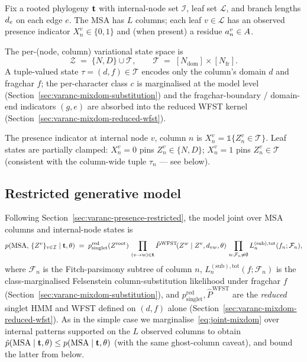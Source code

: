 Fix a rooted phylogeny $\mathbf{t}$ with internal-node set
$\mathcal{I}$, leaf set $\mathcal{L}$, and branch lengths
$d_e$ on each edge $e$. The MSA has $L$ columns; each leaf
$v \in \mathcal{L}$ has an observed presence indicator
$X^v_n \in \{0, 1\}$ and (when present) a residue
$a^v_n \in A$.

The per-(node, column) variational state space is
\begin{equation}
\label{eq:Z-mixdom}
\mathcal{Z} \;=\; \{N, D\} \cup \mathcal{T},
\qquad
\mathcal{T} \;=\; [N_{\text{dom}}] \times [N_{\text{fr}}].
\end{equation}
A tuple-valued state $\tau = (d, f) \in \mathcal{T}$ encodes only the
column's domain $d$ and fragchar $f$; the per-character class $c$ is
marginalised at the model level (Section~\ref{sec:varanc-mixdom-substitution})
and the fragchar-boundary / domain-end indicators $(g, e)$ are
absorbed into the reduced WFST kernel
(Section~\ref{sec:varanc-mixdom-reduced-wfst}).

The presence indicator at internal node $v$, column $n$ is
$X^v_n = \mathbb{1}\{Z^v_n \in \mathcal{T}\}$. Leaf states are
partially clamped: $X^v_n = 0$ pins $Z^v_n \in \{N, D\}$;
$X^v_n = 1$ pins $Z^v_n \in \mathcal{T}$ (consistent with the
column-wide tuple $\tau_n$ — see below).

\subsection{Restricted generative model}
\label{sec:varanc-mixdom-restricted}

Following Section~\ref{sec:varanc-presence-restricted}, the model
joint over MSA columns and internal-node states is
\begin{equation}
\label{eq:joint-mixdom}
p(\text{MSA},\, \{Z^v\}_{v \in \mathcal{I}} \mid \mathbf{t}, \theta)
\;=\; p_{\text{singlet}}^{\text{red}}(Z^{\text{root}})
\,\prod_{(v \to w) \in \mathbf{t}}
   \hat{P}^{\text{WFST}}\!(Z^w \mid Z^v, d_{vw}, \theta)
\,\prod_{n: \mathcal{F}_n \neq \emptyset}
   L^{(\text{sub}),\text{tot}}_n(f_n; \mathcal{F}_n),
\end{equation}
where $\mathcal{F}_n$ is the Fitch-parsimony subtree of column $n$,
$L^{(\text{sub}),\text{tot}}_n(f; \mathcal{F}_n)$ is the
class-marginalised Felsenstein column-substitution likelihood under
fragchar $f$ (Section~\ref{sec:varanc-mixdom-substitution}), and
$p_{\text{singlet}}^{\text{red}}, \hat{P}^{\text{WFST}}$ are the
\emph{reduced} singlet HMM and WFST defined on $(d, f)$ alone
(Section~\ref{sec:varanc-mixdom-reduced-wfst}). As in the simple
case we marginalise~\eqref{eq:joint-mixdom} over internal patterns
supported on the $L$ observed columns to obtain
$\tilde{p}(\text{MSA} \mid \mathbf{t}, \theta) \le
p(\text{MSA} \mid \mathbf{t}, \theta)$ (with the same ghost-column
caveat), and bound the latter from below.

